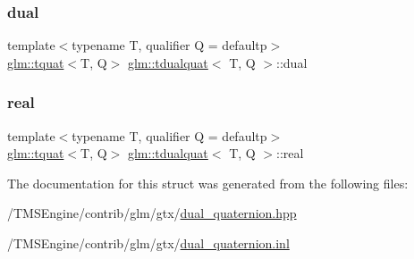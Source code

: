 \subsubsection{\texorpdfstring{dual}{dual}}
{\footnotesize\ttfamily template$<$typename T, qualifier Q = defaultp$>$ \\
\hyperlink{structglm_1_1tquat}{glm\+::tquat}$<$T, Q$>$ \hyperlink{structglm_1_1tdualquat}{glm\+::tdualquat}$<$ T, Q $>$\+::dual}

\mbox{\label{structglm_1_1tdualquat_a25909f92feb14a77756d2e83f9ec0b20}} 
\subsubsection{\texorpdfstring{real}{real}}
{\footnotesize\ttfamily template$<$typename T, qualifier Q = defaultp$>$ \\
\hyperlink{structglm_1_1tquat}{glm\+::tquat}$<$T, Q$>$ \hyperlink{structglm_1_1tdualquat}{glm\+::tdualquat}$<$ T, Q $>$\+::real}



The documentation for this struct was generated from the following files\+:\begin{DoxyCompactItemize}
\item 
/\+T\+M\+S\+Engine/contrib/glm/gtx/\hyperlink{dual__quaternion_8hpp}{dual\+\_\+quaternion.\+hpp}\item 
/\+T\+M\+S\+Engine/contrib/glm/gtx/\hyperlink{dual__quaternion_8inl}{dual\+\_\+quaternion.\+inl}\end{DoxyCompactItemize}
